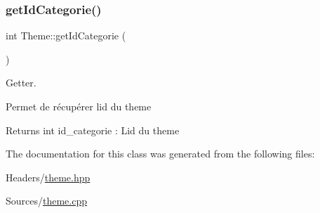 \subsubsection{\texorpdfstring{get\+Id\+Categorie()}{getIdCategorie()}}
{\footnotesize\ttfamily int Theme\+::get\+Id\+Categorie (\begin{DoxyParamCaption}{ }\end{DoxyParamCaption})}



Getter. 

Permet de récupérer l\textquotesingle{}id du theme \begin{DoxyReturn}{Returns}
int id\+\_\+categorie \+: L\textquotesingle{}id du theme 
\end{DoxyReturn}


The documentation for this class was generated from the following files\+:\begin{DoxyCompactItemize}
\item 
Headers/\mbox{\hyperlink{theme_8hpp}{theme.\+hpp}}\item 
Sources/\mbox{\hyperlink{theme_8cpp}{theme.\+cpp}}\end{DoxyCompactItemize}
